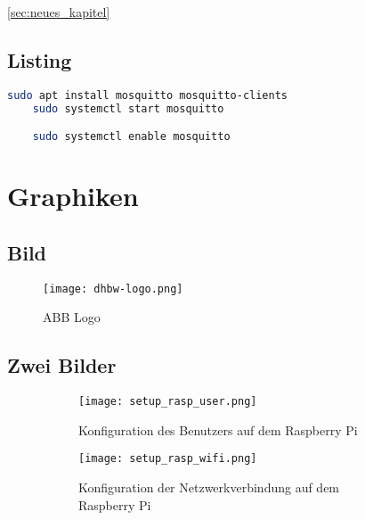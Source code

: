 \autoref{sec:neues_kapitel}                     %

\section{Listing}
\begin{lstlisting}[language=bash,caption={Installation und starten von Mosquitto auf dem Raspberry Pi},label={lst:inst_mosq}]
    sudo apt install mosquitto mosquitto-clients
    sudo systemctl start mosquitto

    sudo systemctl enable mosquitto
\end{lstlisting}

\chapter{Graphiken}

\section{Bild}
\begin{figure}[H]                               %
    \center
    \texttt{[image: dhbw-logo.png]}
    \caption{ABB Logo} \cite[58]{SBCs}
    \label{fig:abb_logo}
\end{figure}

\section{Zwei Bilder}
\begin{figure}[H]                                   %
    \centering
    \begin{subfigure}[b]{0.44\textwidth}
        \centering
        \texttt{[image: setup\_rasp\_user.png]}
        \caption{Konfiguration des Benutzers auf dem Raspberry Pi} 
        \label{fig:setup_rasp_user}
    \end{subfigure}
    \hfill
    \begin{subfigure}[b]{0.44\textwidth}
        \centering
        \texttt{[image: setup\_rasp\_wifi.png]}
        \caption{Konfiguration der Netzwerkverbindung auf dem Raspberry Pi}
        \label{fig:setup_rasp_wifi}
    \end{subfigure}
    \caption*{\cite{ultraschallsensor_p&f}}
\end{figure}


